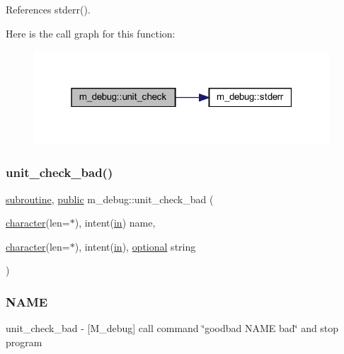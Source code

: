 References stderr().

Here is the call graph for this function\+:
\nopagebreak
\begin{figure}[H]
\begin{center}
\leavevmode
\includegraphics[width=313pt]{namespacem__debug_a0ae797092ab85a8ba9258dc9f8949189_cgraph}
\end{center}
\end{figure}
\mbox{\label{namespacem__debug_a668813eec59e4c16d3bbc2d317e8cdee}} 
\subsubsection{\texorpdfstring{unit\+\_\+check\+\_\+bad()}{unit\_check\_bad()}}
{\footnotesize\ttfamily \hyperlink{M__stopwatch_83_8txt_acfbcff50169d691ff02d4a123ed70482}{subroutine}, \hyperlink{M__stopwatch_83_8txt_a2f74811300c361e53b430611a7d1769f}{public} m\+\_\+debug\+::unit\+\_\+check\+\_\+bad (\begin{DoxyParamCaption}\item[{\hyperlink{option__stopwatch_83_8txt_abd4b21fbbd175834027b5224bfe97e66}{character}(len=$\ast$), intent(\hyperlink{M__journal_83_8txt_afce72651d1eed785a2132bee863b2f38}{in})}]{name,  }\item[{\hyperlink{option__stopwatch_83_8txt_abd4b21fbbd175834027b5224bfe97e66}{character}(len=$\ast$), intent(\hyperlink{M__journal_83_8txt_afce72651d1eed785a2132bee863b2f38}{in}), \hyperlink{option__stopwatch_83_8txt_aa4ece75e7acf58a4843f70fe18c3ade5}{optional}}]{string }\end{DoxyParamCaption})}



\subsubsection*{N\+A\+ME}

unit\+\_\+check\+\_\+bad -\/ \mbox{[}M\+\_\+debug\mbox{]} call command \char`\"{}goodbad N\+A\+M\+E bad\char`\"{} and stop program 

